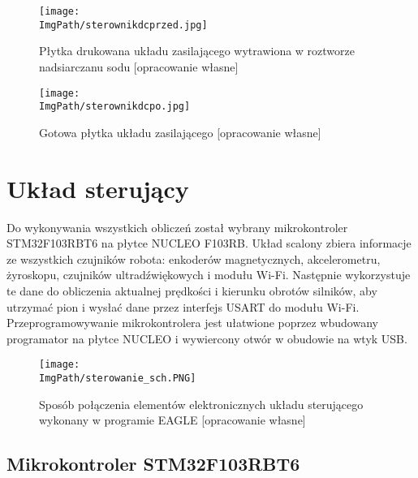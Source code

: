 \documentclass[a4paper,12pt,twoside,openany]{report}
\newcommand{\ImgPath}{.}
\begin{document}
\begin{figure}[!htbp]
	\begin{center}
\centering
\texttt{[image: \\ImgPath/sterownikdcprzed.jpg]}
\end{center}
	\caption{Płytka drukowana układu zasilającego wytrawiona w roztworze nadsiarczanu sodu [opracowanie własne]}
	\label{schematKomunikacji}
\end{figure}

\begin{figure}[!htbp]
	\begin{center}
\centering
\texttt{[image: \\ImgPath/sterownikdcpo.jpg]}
\end{center}
	\caption{Gotowa płytka układu zasilającego [opracowanie własne]}
	\label{schematKomunikacji}
\end{figure}

\newpage

\section{Układ sterujący}

Do wykonywania wszystkich obliczeń został wybrany mikrokontroler\\ STM32F103RBT6 na płytce NUCLEO F103RB. Układ scalony zbiera informacje ze wszystkich czujników robota: enkoderów magnetycznych, akcelerometru, żyroskopu, czujników ultradźwiękowych i modułu Wi-Fi. Następnie wykorzystuje te dane do obliczenia aktualnej prędkości i kierunku obrotów silników, aby utrzymać pion i wysłać dane przez interfejs USART do modułu Wi-Fi.
Przeprogramowywanie mikrokontrolera jest ułatwione poprzez wbudowany programator na płytce NUCLEO i wywiercony otwór w obudowie na wtyk USB.

\begin{figure}[!htbp]
	\begin{center}
\centering
\texttt{[image: \\ImgPath/sterowanie\_sch.PNG]}
\end{center}
	\caption{Sposób połączenia elementów elektronicznych układu sterującego wykonany w programie EAGLE [opracowanie własne]}
	\label{schematKomunikacji}
\end{figure}

\newpage

\newpage

\subsection{Mikrokontroler STM32F103RBT6}
\end{document}
